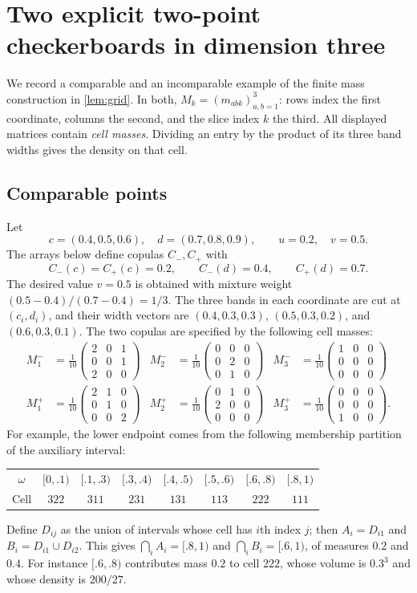 \documentclass[a4paper,11pt]{amsart}
\numberwithin{equation}{section}
\theoremstyle{definition}
\theoremstyle{remark}
\newcommand{\mat}[1]{\begin{pmatrix}#1\end{pmatrix}}
\begin{document}
\clearpage

\section{Two explicit two-point checkerboards in dimension three}\label{app:two-examples}
We record a comparable and an incomparable example of the finite mass
construction in \cref{lem:grid}. In both, $M_k=(m_{abk})_{a,b=1}^3$: rows index the first
coordinate, columns the second, and the slice index $k$ the third.
All displayed matrices contain \emph{cell masses}. Dividing an entry by
the product of its three band widths gives the density on that cell.

\subsection{Comparable points}
Let
\[
 c=(0.4,0.5,0.6),\quad d=(0.7,0.8,0.9),\qquad u=0.2,\quad v=0.5.
\]
The arrays below define copulas $C_-,C_+$ with
\[
C_-(c)=C_+(c)=0.2,\qquad C_-(d)=0.4,\qquad C_+(d)=0.7.
\]
The desired value $v=0.5$ is obtained with mixture weight
$(0.5-0.4)/(0.7-0.4)=1/3$.
The three bands in each coordinate are cut at $(c_i,d_i)$, and their
width vectors are $(0.4,0.3,0.3)$, $(0.5,0.3,0.2)$, and $(0.6,0.3,0.1)$.
The two copulas are specified by the following cell masses:
\[\begin{aligned}
M^{-}_{1}&=\frac1{10}\mat{2&0&1\\0&0&1\\2&0&0}&
M^{-}_{2}&=\frac1{10}\mat{0&0&0\\0&2&0\\0&1&0}&
M^{-}_{3}&=\frac1{10}\mat{1&0&0\\0&0&0\\0&0&0}\\[5pt]
M^{+}_{1}&=\frac1{10}\mat{2&1&0\\0&1&0\\0&0&2}&
M^{+}_{2}&=\frac1{10}\mat{0&1&0\\2&0&0\\0&0&0}&
M^{+}_{3}&=\frac1{10}\mat{0&0&0\\0&0&0\\1&0&0}.
\end{aligned}\]
For example, the lower endpoint comes from the following membership
partition of the auxiliary interval:
\begin{center}\small\setlength{\tabcolsep}{3.6pt}
\begin{tabular}{c@{\quad}ccccccc}
\toprule
$\omega$ & $[0,.1)$ & $[.1,.3)$ & $[.3,.4)$ & $[.4,.5)$ & $[.5,.6)$ & $[.6,.8)$ & $[.8,1)$\\
Cell & $322$ & $311$ & $231$ & $131$ & $113$ & $222$ & $111$\\
\bottomrule
\end{tabular}
\end{center}
Define $D_{ij}$ as the union of intervals whose cell has $i$th index $j$;
then $A_i=D_{i1}$ and $B_i=D_{i1}\cup D_{i2}$. This gives
$\bigcap_iA_i=[.8,1)$ and $\bigcap_iB_i=[.6,1)$, of measures $0.2$ and
$0.4$. For instance $[.6,.8)$ contributes mass $0.2$ to cell $222$,
whose volume is $0.3^3$ and whose density is $200/27$.
\end{document}
